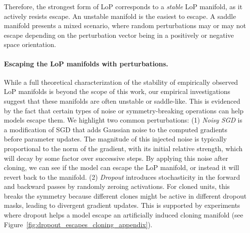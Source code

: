 \documentclass{article}
\newcommand{\GIU}[1]{\todo[color=purple!30,size=\tiny]{GIU: #1}}
\numberwithin{figure}{section}
\begin{document}
Therefore, the strongest form of LoP corresponds to a \emph{stable} LoP manifold, as it actively resists escape. An unstable manifold is the easiest to escape. A saddle manifold presents a mixed scenario, where random perturbations may or may not escape depending on the perturbation vector being in a positively or negative space orientation. 


\paragraph{Escaping the LoP manifolds with perturbations.}
While a full theoretical characterization of the stability of empirically observed LoP manifolds is beyond the scope of this work, our empirical investigations suggest that these manifolds are often unstable or saddle-like. This is evidenced by the fact that certain types of noise or symmetry-breaking operations can help models escape them. We highlight two common perturbations:
(1) \emph{Noisy SGD} is a modification of SGD that adds Gaussian noise to the computed gradients before parameter updates. The magnitude of this injected noise is typically proportional to the norm of the gradient, with its initial relative strength, which will decay by some factor over successive steps. By applying this noise after cloning, we can see if the model can escape the LoP manifold, or instead it will revert back to the manifold. 
(2) \emph{Dropout} introduces stochasticity in the forward and backward passes by randomly zeroing activations. For cloned units, this breaks the symmetry because different clones might be active in different dropout masks, leading to divergent gradient updates. This is supported by experiments where dropout helps a model escape an artificially induced cloning manifold (see Figure~\ref{fig:dropout_escapes_cloning_appendix}).
    
\end{document}
